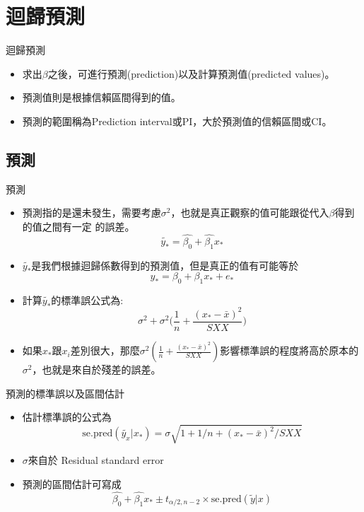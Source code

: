 \documentclass[xcolor=dvipsnames]{beamer}
\begin{document}
\section{迴歸預測}
\begin{frame}{迴歸預測}
\begin{itemize}
\item 求出$\beta$之後，可進行預測(prediction)以及計算預測值(predicted values)。
\item 預測值則是根據信賴區間得到的值。
\item 預測的範圍稱為Prediction interval或PI，大於預測值的信賴區間或CI。
\end{itemize}
\end{frame}
\subsection{預測}
\begin{frame}{預測}
\begin{itemize}
\item 預測指的是還未發生，需要考慮$\sigma^2$，也就是真正觀察的值可能跟從代入$\beta$得到的值之間有一定
的誤差。
\[\tilde{y_{*}}=\hat{\beta_{0}}+\hat{\beta_{1}}x_{*}\]
\item $\tilde{y_{*}}$是我們根據迴歸係數得到的預測值，但是真正的值有可能等於
\[ y_{*}=\beta_{0}+\beta_{1}x_{*}+e_{*} \]
\item 計算$\tilde{y_{*}}$的標準誤公式為:
\[\sigma^2+\sigma^2\Big(\frac{1}{n}+\frac{(x_{*}-\bar{x})^2}{SXX}\Big)\]
\item 如果$x_{*}$跟$x_{i}$差別很大，那麼$\sigma^2(\frac{1}{n}+\frac{(x_{*}-\bar{x})^2}{SXX})$影響標準誤的程度將高於原本的$\sigma^2$，也就是來自於殘差的誤差。
\end{itemize}
\end{frame}
\begin{frame}{預測的標準誤以及區間估計}
\begin{itemize}
\item 估計標準誤的公式為
\[ \textrm{se.pred}(\tilde{y_{x}}|x_{*})=\sigma\sqrt{1+1/n+(x_{*}-\bar{x})^2/SXX}\]

\item $\sigma$來自於 Residual standard error
\item 預測的區間估計可寫成
\[ \hat{\beta_{0}}+\hat{\beta_{1}}x_{*}\pm t_{\alpha/2, n-2}\times \textrm{se.pred}(\tilde{y}|x)\]
\end{itemize}
\end{frame}
\end{document}
